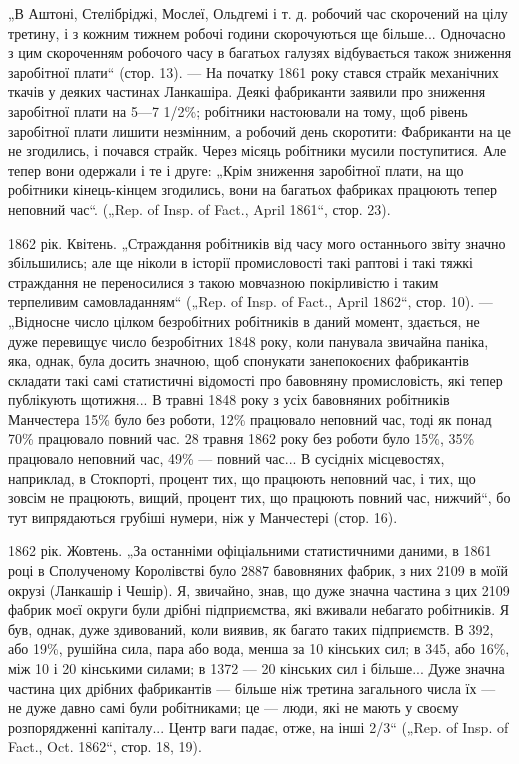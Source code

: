 „В Аштоні, Стелібріджі, Мослеї, Ольдгемі і т. д. робочий
час скорочений на цілу третину, і з кожним тижнем робочі години
скорочуються ще більше... Одночасно з цим скороченням
робочого часу в багатьох галузях відбувається також зниження
заробітної плати“ (стор. 13). — На початку 1861 року стався
страйк механічних ткачів у деяких частинах Ланкашіра. Деякі
фабриканти заявили про зниження заробітної плати на 5—7 1/2\%;
робітники настоювали на тому, щоб рівень заробітної плати лишити
незмінним, а робочий день скоротити: Фабриканти на це не
згодились, і почався страйк. Через місяць робітники мусили поступитися.
Але тепер вони одержали і те і друге: „Крім зниження
заробітної плати, на що робітники кінець-кінцем згодились,
вони на багатьох фабриках працюють тепер неповний час“.
(„Rep. of Insp. of Fact., April 1861“, стор. 23).

1862 рік. Квітень. „Страждання робітників від часу мого
останнього звіту значно збільшились; але ще ніколи в історії
промисловості такі раптові і такі тяжкі страждання не переносилися
з такою мовчазною покірливістю і таким терпеливим
самовладанням“ („Rep. of Insp. of Fact., April 1862“, стор. 10). —
„Відносне число цілком безробітних робітників в даний момент,
здається, не дуже перевищує число безробітних 1848 року,
коли панувала звичайна паніка, яка, однак, була досить значною,
щоб спонукати занепокоєних фабрикантів складати такі
самі статистичні відомості про бавовняну промисловість, які
тепер публікують щотижня... В травні 1848 року з усіх бавовняних
робітників Манчестера 15\% було без роботи, 12\% працювало
неповний час, тоді як понад 70\% працювало повний час. 28 травня
1862 року без роботи було 15\%, 35\% працювало неповний час,
49\% — повний час... В сусідніх місцевостях, наприклад, в Стокпорті,
процент тих, що працюють неповний час, і тих, що зовсім
не працюють, вищий, процент тих, що працюють повний час,
нижчий“, бо тут випрядаються грубіші нумери, ніж у Манчестері
(стор. 16).

1862 рік. Жовтень. „За останніми офіціальними статистичними
даними, в 1861 році в Сполученому Королівстві було 2887 бавовняних
фабрик, з них 2109 в моїй окрузі (Ланкашір і Чешір). Я, звичайно,
знав, що дуже значна частина з цих 2109 фабрик моєї округи
були дрібні підприємства, які вживали небагато робітників. Я
був, однак, дуже здивований, коли виявив, як багато таких підприємств.
В 392, або 19\%, рушійна сила, пара або вода, менша за
10 кінських сил; в 345, або 16\%, між 10 і 20 кінськими силами;
в 1372 — 20 кінських сил і більше... Дуже значна частина цих
дрібних фабрикантів — більше ніж третина загального числа їх —
не дуже давно самі були робітниками; це — люди, які не мають
у своєму розпорядженні капіталу... Центр ваги падає, отже, на
інші 2/3“ („Rep. of Insp. of Fact., Oct. 1862“, стор. 18, 19).
